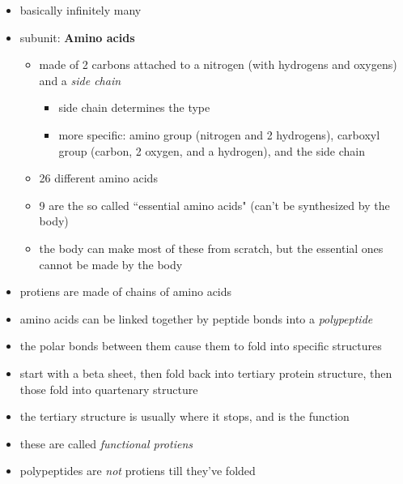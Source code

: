 \documentclass{article}
\theoremstyle{definition}
\begin{document}
\begin{itemize}
	\item basically infinitely many
	\item subunit: \textbf{Amino acids} 
		\begin{itemize}
			\item made of 2 carbons attached to a nitrogen (with hydrogens and oxygens) and a \textit{side chain} 
				\begin{itemize}
					\item side chain determines the type
					\item more specific: amino group (nitrogen and 2 hydrogens), carboxyl group (carbon, 2 oxygen, and a hydrogen), and the side chain
				\end{itemize}
			\item 26 different amino acids
			\item 9 are the so called ``essential amino acids" (can't be synthesized by the body)
			\item the body can make most of these from scratch, but the essential ones cannot be made by the body
		\end{itemize}
	\item protiens are made of chains of amino acids
	\item amino acids can be linked together by peptide bonds into a \textit{polypeptide} 
	\item the polar bonds between them cause them to fold into specific structures
	\item start with a beta sheet, then fold back into tertiary protein structure, then those fold into quartenary structure
	\item the tertiary structure is usually where it stops, and is the function
	\item these are called \textit{functional protiens} 
	\item polypeptides are \textit{not} protiens till they've folded
\end{itemize}
\end{document}
